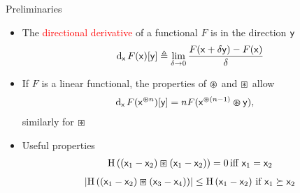 \documentclass{beamer}
\newlength{\onecolwid}
\begin{document}
\begin{columns}[t]
\begin{column}{\onecolwid}
\begin{block}{\Large Preliminaries}
\begin{itemize}
    \vspace{1cm}
  \item The \textcolor{red}{directional derivative} of a functional $F$ is in the direction $\mathsf{y}$
    \begin{align*}
      \mathrm{d}_{ \mathsf{x} }\hspace{0.05cm} F(\mathsf{x})[\mathsf{y}] \triangleq \lim_{\delta \rightarrow 0} \frac{F(\mathsf{x} + \delta \mathsf{y} ) - F(\mathsf{x})}{\delta} 
    \end{align*}
    
    \vspace{1cm}
  \item If $F$ is a linear functional, the properties of $\varoast$ and $\boxast$ allow
    \begin{align*}
      \mathrm{d}_{ \mathsf{x} }\hspace{0.05cm} F(\mathsf{x}^{\varoast n})[\mathsf{y}] &= n F( \mathsf{x}^{\varoast (n-1)} \varoast \mathsf{y} ) ,
    \end{align*}
    similarly for $\boxast$

    \vspace{1cm}
  \item Useful properties
    \begin{align*}
      \mathrm{H} \left( (\mathsf{x}_1 - \mathsf{x}_2) \boxast (\mathsf{x}_1 - \mathsf{x}_2) \right) = 0 \,  \text{iff $\mathsf{x}_1=\mathsf{x}_2$}
    \end{align*}
    \begin{align*}
      \left\lvert\mathrm{H} \left( (\mathsf{x}_1 - \mathsf{x}_2) \boxast (\mathsf{x}_3 - \mathsf{x}_4)  \right)\right\rvert \leq \mathrm{H} \left( \mathsf{x}_1 - \mathsf{x}_2 \right)\, \text{if $\mathsf{x}_1 \succeq \mathsf{x}_2$} 
    \end{align*}
  \end{itemize}
\end{block}
\end{column}


\end{columns}
\end{document}
